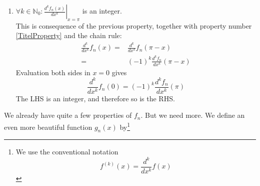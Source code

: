 \begin{enumerate}
\begin{enumerate}[i]
\begin{eqnarray*}
 & = \sum\limits_{i=0}^{n} C^{n}_{i}\frac{\left( - 1 \right)^i}{n!}a^{n-i} b^i x^{n+i}
\end{eqnarray*}
\noindent The coefficients $C^{i}_{n}$ are known as the binomial coefficients, all of which can be read off Pascale's triangle, and are all integer. Taking the $k^{th}$ derivative of this with respect to $x$ gives:
\begin{eqnarray*}
\frac{d^k f_n(x)}{dx^k} & = \sum\limits_{i=k-n}^{n}C^{n}_{i} \frac{\left( -1 \right)^{i}}{n!} a^{n-i} b^i \frac{(n+i)!}{(n+i-k)!} x^{n+i-k}
\end{eqnarray*}
\noindent When plugging in $0$ for $x$ in the derivative, we are left with the coefficient of the $0^{th}$ order term.
\begin{eqnarray*}
\left. \frac{d^k f_n(x)}{dx^k} \right|_{x=0} & = C^{n}_{k-n} \frac{\left( -1 \right)^{k-n}}{n!} a^{2n-k} b^{k-n} k! \\
 & = C^{n}_{k-n}\left( -1 \right)^{k-n} a^{2n-k} b^{k-n} \frac{k!}{n!}
\end{eqnarray*}
\noindent Because $k\geq n$, the fraction $\frac{k!}{n!}$ is equal to $k \left( k-1 \right) \left( k-2 \right) \cdots \left( n+2 \right) \left( n+1 \right)$, which is an integer. All the other coefficients are integers as well, which proves the assessment for the case $n \leq k \leq 2n$.
\item $\bf{2n < k:}$ because $k$ is larger than the degree of the polynomial $f_n(x)$, taking $k$ times its derivatives cancels out all its terms and we are left with $0$.
\end{enumerate}
\item $\forall k \in \mathbb{N}_0: \left.\frac{d^k f_n(x)}{dx^k}\right|_{x=\pi}$ is an integer.\\
\noindent This is consequence of the previous property, together with property number \ref{TitelProperty} and the chain rule:
\begin{eqnarray*}
\frac{d^k}{dx^k}f_n\left( x \right)  = & \frac{d^k}{dx^k} f_n \left( \pi -x \right) \\
= &  \left( -1 \right)^{k}\frac{d^k f_n}{dx^k}\left( \pi - x \right)
\end{eqnarray*}
\noindent Evaluation both sides in $x=0$ gives
$$
\frac{d^k}{dx^k}f_n\left( 0 \right)  = 
\left( -1 \right)^{k}\frac{d^k f_n}{dx^k}\left( \pi \right)
$$
\noindent The LHS is an integer, and therefore so is the RHS.
\end{enumerate}
\noindent We already have quite a few properties of $f_n$. But we need more. We define an even more beautiful function $g_n(x)$ by\footnote{We use the conventional notation $$ f^{(k)}(x) = \frac{d^k}{dx^k} f (x) $$}
